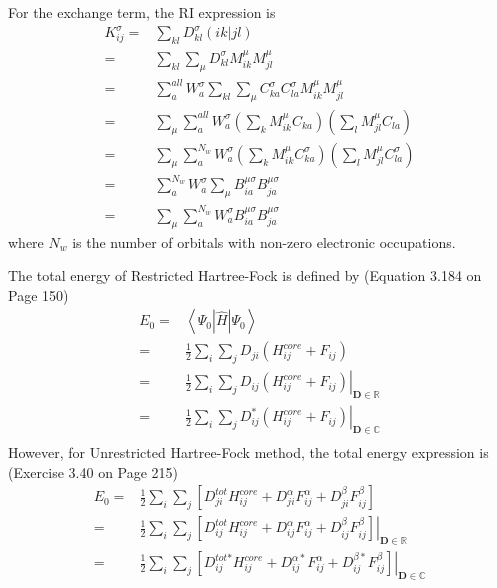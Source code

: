 \documentclass[a4paper,12pt]{article}
\begin{document}
For the exchange term, the RI expression is
\begin{equation}
	\begin{split}
		K_{ij}^{\sigma} = &\sum_{kl}D_{kl}^{\sigma}\left( ik|jl \right)\\
		= &\sum_{kl}\sum_{\mu}D_{kl}^{\sigma}M_{ik}^{\mu}M_{jl}^{\mu}\\
		= &\sum_{a}^{all}W_{a}^{\sigma}\sum_{kl}\sum_{\mu}C_{ka}^{\sigma}C_{la}^{\sigma}M_{ik}^{\mu}M_{jl}^{\mu}\\
		= &\sum_{\mu}\sum_{a}^{all}W_{a}^{\sigma}\left(\sum_{k}M_{ik}^{\mu}C_{ka}\right)\left(\sum_{l}M_{jl}^{\mu}C_{la}  \right)\\
		= &\sum_{\mu}\sum_{a}^{N_w}W_{a}^{\sigma}
		\left(\sum_{k}M_{ik}^{\mu}C_{ka}^{\sigma}\right)\left(\sum_{l}M_{jl}^{\mu}C_{la}^{\sigma}  \right)\\
		= &\sum_{a}^{N_w}W_{a}^{\sigma}\sum_{\mu}B_{ia}^{\mu\sigma}B_{ja}^{\mu\sigma}\\
		= &\sum_{\mu}\sum_{a}^{N_w}W_{a}^{\sigma}B_{ia}^{\mu\sigma}B_{ja}^{\mu\sigma}
	\end{split}
\end{equation}
where $N_w$ is the number of orbitals with non-zero electronic occupations.

The total energy of Restricted Hartree-Fock is defined by (Equation 3.184 on Page 150)
\begin{equation}
	\begin{split}
		E_0 =&\left<\Psi_0\left|\hat{H}\right|\Psi_0\right>\\
		=&\frac{1}{2}\sum_{i}\sum_{j}D_{ji}\left( H_{ij}^{core}+F_{ij} \right)\\
		=&\left.\frac{1}{2}\sum_{i}\sum_{j}D_{ij}\left( H_{ij}^{core}+F_{ij} \right)\right|_{\textbf{D}\in\mathbb{R}}\\
		=&\left.\frac{1}{2}\sum_{i}\sum_{j}D_{ij}^{*}\left( H_{ij}^{core}+F_{ij} \right)\right|_{\textbf{D}\in\mathbb{C}}\\
	\end{split}
\end{equation}
However, for Unrestricted Hartree-Fock method, the total energy expression is (Exercise 3.40 on Page 215)
\begin{equation}
	\begin{split}
		E_0=&\frac{1}{2}\sum_{i}\sum_{j}\left[D_{ji}^{\textit{tot}}H_{ij}^{core}+D_{ji}^{\alpha}F_{ij}^{\alpha}+D_{ji}^{\beta}F_{ij}^{\beta} \right]\\
		   =&\left.\frac{1}{2}\sum_{i}\sum_{j}\left[D_{ij}^{\textit{tot}}H_{ij}^{core}+D_{ij}^{\alpha}F_{ij}^{\alpha}+D_{ij}^{\beta}F_{ij}^{\beta} \right]
		\right|_{\textbf{D}\in\mathbb{R}}\\
		   =&\left.\frac{1}{2}\sum_{i}\sum_{j}\left[D_{ij}^{\textit{tot}*}H_{ij}^{core}+D_{ij}^{\alpha *}F_{ij}^{\alpha}
		+D_{ij}^{\beta *}F_{ij}^{\beta} \right]\right|_{\textbf{D}\in\mathbb{C}}\\
	\end{split}
\end{equation}
\end{document}
